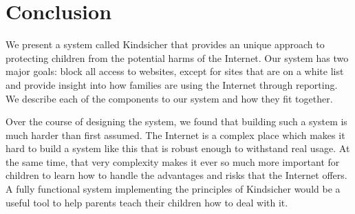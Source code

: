 
\section{Conclusion}

We present a system called Kindsicher that provides an unique approach to
protecting children from the potential harms of the Internet. Our system has
two major goals: block all access to websites, except for sites that are on a
white list and provide insight into how families are using the Internet through
reporting. We describe each of the components to our system and how they fit
together.

Over the course of designing the system, we found that building such a system
is much harder than first assumed. The Internet is a complex place which makes
it hard to build a system like this that is robust enough to withstand real
usage. At the same time, that very complexity makes it ever so much more
important for children to learn how to handle the advantages and risks that
the Internet offers.  A fully functional system implementing the principles of
Kindsicher would be a useful tool to help parents teach their children how to
deal with it.

